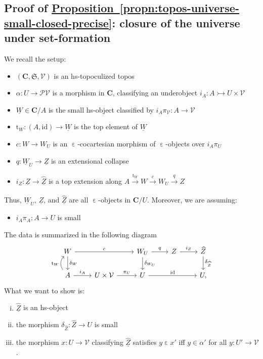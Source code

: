 \documentclass{amsart}
\newcommand\alttext{\texorpdfstring}
\newcommand\bC{\mathbf{C}}
\newcommand\cV{\mathcal{V}}
\newcommand\ein{\mathrel{\varepsilon}}
\newcommand\fS{\mathfrak{S}}
\newcommand\id{\mathrm{id}}
\newcommand\pow{\mathcal{P}}
\newcommand\rt{\mathrm{t}}
\newcommand\tox[2][]{\xrightarrow[#1]{#2}}
\newcommand\tto{\rightarrowtail}
\newcommand\und[1]{\underline{#1}}
\newcommand\unein{{\ein}}
\newcommand\wh[1]{\widehat{#1}}
\theoremstyle{definition}
\theoremstyle{remark}
\theoremstyle{plainwithref}
\begin{document}
\subsection{Proof of \alttext{\hyperref[propn:topos-universe-small-closed-precise]{Proposition~\ref*{propn:topos-universe-small-closed-precise}}}{Proposition~\ref*{propn:topos-universe-small-closed-precise}}: closure of the universe under set-formation} \label{subsec:universe-closure-proof}
We recall the setup:
\begin{itemize}
\item \( (\bC, \fS, \cV) \) is an hs-topoculized topos
\item \( \alpha \colon U \to \pow \cV \) is a morphism in \( \bC \), classifying an underobject \( i_A \colon A \tto U \times \cV \)
\item \( \und W \in \bC / A \) is the small hs-object classified by \( i_A \pi_{\cV} \colon A \to \cV \)
\item \( \rt_W \colon (A, \id) \to \und W \) is the top element of \( \und W \)
\item \( c \colon W \to W_U \) is an \( \unein \)-cocartesian morphism of \( \unein \)-objects over \( i_A \pi_U \)
\item \( q \colon \und W_U \to \und Z \) is an extensional collapse
\item \( i_Z \colon \und Z \to \und{\wh Z} \) is a top extension along \( A \tox{\rt_{W}} W \tox{c} W_U \tox{q} Z \)
\end{itemize}
Thus, \( \und W_U \), \( \und Z \), and \( \und{\wh Z} \) are all \( \unein \)-objects in \( \bC / U \).
Moreover, we are assuming:
\begin{itemize}
\item \( i_A \pi_A \colon A \to U \) is small
\end{itemize}
The data is summarized in the following diagram
\[
    \begin{tikzcd}
      W \ar[rr, "c"] \ar[d, "\delta_W"] & &
      W_U \ar[r, "q"] \ar[d, "\delta_{W_U}"] &
      Z \ar[r, "i_Z"] &
      \wh Z \ar[d, "\delta_{\wh Z}"] \\
      A \ar[r, "i_A"] \ar[u, bend left=40pt, "\rt_W" pos=0.45]
      & U \times \cV \ar[r, "\pi_U"]
      & U \ar[rr, "\id"]
      && U,
    \end{tikzcd}
  \]
What we want to show is:
\begin{enumerate}[(i)]
\item \( \und{\wh Z} \) is an hs-object
\item the morphism \( \delta_{\wh Z} \colon \wh Z \to U \) is small
\item the morphism \( x \colon U \to \cV \) classifying \( \und{\wh Z} \) satisfies \( y \ein x' \) iff \( y \in \alpha' \) for all \( y \colon U' \to \cV \).
\end{enumerate}
\end{document}
